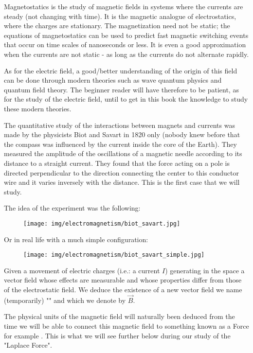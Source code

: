 	Magnetostatics is the study of magnetic fields in systems where the currents are steady (not changing with time). It is the magnetic analogue of electrostatics, where the charges are stationary. The magnetization need not be static; the equations of magnetostatics can be used to predict fast magnetic switching events that occur on time scales of nanoseconds or less. It is even a good approximation when the currents are not static - as long as the currents do not alternate rapidly.
	
	As for the electric field, a good/better understanding of the origin of this field can be done through modern theories such as wave quantum physics and quantum field theory. The beginner reader will have therefore to be patient, as for the study of the electric field, until to get in this book the knowledge to study these modern theories.
	
	The quantitative study of the interactions between magnets and currents was made by the physicists Biot and Savart in 1820 only (nobody knew before that the compass was influenced by the current inside the core of the Earth). They measured the amplitude of the oscillations of a magnetic needle according to its distance to a straight current. They found that the force acting on a pole is directed perpendicular to the direction connecting the center to this conductor wire and it varies inversely with the distance. This is the first case that we will study.
	
	The idea of the experiment was the following:
	\begin{figure}[H]
		\centering
		\texttt{[image: img/electromagnetism/biot\_savart.jpg]}
	\end{figure}
	\pagebreak
	Or in real life with a much simple configuration:
	\begin{figure}[H]
		\centering
		\texttt{[image: img/electromagnetism/biot\_savart\_simple.jpg]}
	\end{figure}
	Given a movement of electric charges (i.e.: a current $I$) generating in the space a vector field whose effects are measurable and whose properties differ from those of the electrostatic field. We deduce the existence of a new vector field we name (temporarily) "" and which we denote by $\vec{B}$.
	
	The physical units of the magnetic field will naturally been deduced from the time we will be able to connect this magnetic field to something known as a Force for example . This is what we will see further below during our study of the "Laplace Force".
	
